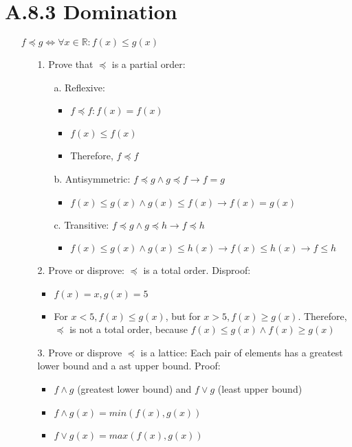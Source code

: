 \documentclass[12pt]{article}
\begin{document}
\section*{A.8.3 Domination}
\begin{enumerate}
  \item[] $f\preceq g \iff \forall x\in\mathbb{R} : f(x) \leq g(x)$
    \begin{enumerate}
      \item[1.] Prove that $\preceq$ is a partial order:
        \begin{enumerate}
          \item[a.] Reflexive:
            \begin{itemize}
              \item $f \preceq f : f(x) = f(x)$
              \item $f(x) \leq f(x)$
              \item Therefore, $f \preceq f$
            \end{itemize}
          \item[b.] Antisymmetric: $f \preceq g \wedge g\preceq f \rightarrow f = g$
            \begin{itemize}
              \item $f(x)\leq g(x) \wedge g(x)\leq f(x) \rightarrow f(x)=g(x)$
            \end{itemize}
          \item[c.] Transitive: $f\preceq g\wedge g\preceq h \rightarrow f\preceq h$
            \begin{itemize}
              \item $f(x)\leq g(x) \wedge g(x) \leq h(x) \rightarrow f(x)\leq h(x) \rightarrow f \leq h$
            \end{itemize}
        \end{enumerate}
      \item[2.] Prove or disprove: $\preceq$ is a total order. Disproof:
        \begin{itemize}
          \item $f(x) = x, g(x) = 5$
          \item For $x < 5, f(x) \leq g(x)$, but for $x > 5, f(x) \geq g(x)$. Therefore, $\preceq$ is not a total order, because $f(x) \leq g(x) \wedge f(x) \geq g(x)$ 
        \end{itemize}
      \item[3.] Prove or disprove $\preceq$ is a lattice: Each pair of elements has a greatest lower bound and a ast upper bound. Proof:
        \begin{itemize}
          \item $f\wedge g$ (greatest lower bound) and $f\vee g$ (least upper bound)
          \item $f\wedge g(x) = min(f(x),g(x))$
          \item $f\vee g(x) = max(f(x),g(x))$
        \end{itemize}
    \end{enumerate}
\end{enumerate}
\end{document}

